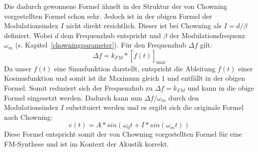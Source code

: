 Die dadurch gewonnene Formel ähnelt in der Struktur der von Chowning vorgestellten Formel schon sehr. Jedoch ist in der obigen Formel der Modulationsindex $I$ nicht direkt ersichtlich. Dieser ist bei Chowning als $I=d/\beta$ definiert. Wobei $d$ dem Frequenzhub entspricht und $\beta$ der Modulationsfrequenz $\omega_m$ (s. Kapitel~\ref{chowningparameter}). Für den Frequenzhub $\Delta f$ gilt: \cite[S. 219]{lathi}
\begin{equation*}
\Delta f = k_{FM}*[\dot f(t)]_{\max}
\end{equation*}
Da unser $f(t)$ eine Sinusfunktion darstellt, entspricht die Ableitung $\dot f(t)$ einer Kosinusfunktion und somit ist ihr Maximum gleich $1$ und entfällt in der obigen Formel. Somit reduziert sich der Frequenzhub zu $\Delta f=k_{FM}$ und kann in die obige Formel eingesetzt werden. Dadurch kann nun $\Delta f / \omega_m$ durch den Modulationsindex $I$ substituiert werden und es ergibt sich die originale Formel nach Chowning:
\begin{equation}
e(t)=A*sin(\omega_0t+I*sin(\omega_m t))
\label{eq:FM_Chowning}
\end{equation}
Diese Formel entspricht somit der von Chowning vorgestellten Formel für eine FM-Synthese und ist im Kontext der Akustik korrekt.



\FloatBarrier
